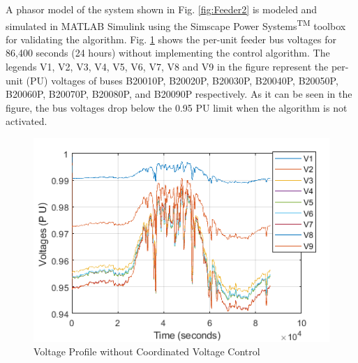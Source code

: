 A phasor model of the system shown in Fig. \ref{fig:Feeder2} is modeled and simulated  in MATLAB\textsuperscript{\textregistered} Simulink\textsuperscript{\textregistered} using the Simscape Power Systems\textsuperscript{TM} toolbox for validating the algorithm. Fig. \ref{fig:without_vvc} shows the per-unit feeder bus voltages for 86,400 seconds (24 hours) without implementing the control algorithm. The legends V1, V2, V3, V4, V5, V6, V7, V8 and V9 in the figure represent the per-unit (PU) voltages of buses B20010P, B20020P, B20030P, B20040P, B20050P, B20060P, B20070P, B20080P, and B20090P respectively. As it can be seen in the figure, the bus voltages drop below the 0.95 PU limit when the algorithm is not activated.

\begin{figure}[!h]
\centering
\includegraphics[width=\linewidth]{figs/CVC/Without_VVC.png}
\caption{Voltage Profile without Coordinated Voltage Control}
\label{fig:without_vvc}
\end{figure}

